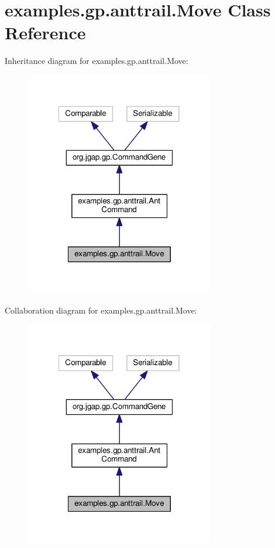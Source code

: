 \hypertarget{classexamples_1_1gp_1_1anttrail_1_1_move}{\section{examples.\-gp.\-anttrail.\-Move Class Reference}
\label{classexamples_1_1gp_1_1anttrail_1_1_move}
}


Inheritance diagram for examples.\-gp.\-anttrail.\-Move\-:
\nopagebreak
\begin{figure}[H]
\begin{center}
\leavevmode
\includegraphics[width=233pt]{classexamples_1_1gp_1_1anttrail_1_1_move__inherit__graph}
\end{center}
\end{figure}


Collaboration diagram for examples.\-gp.\-anttrail.\-Move\-:
\nopagebreak
\begin{figure}[H]
\begin{center}
\leavevmode
\includegraphics[width=233pt]{classexamples_1_1gp_1_1anttrail_1_1_move__coll__graph}
\end{center}
\end{figure}
